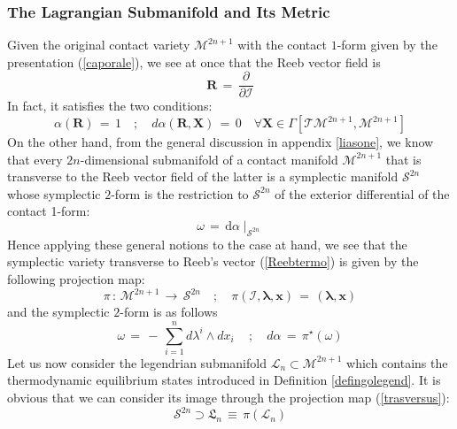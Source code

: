 \documentclass[10pt,a4paper]{article}
\begin{document}
\subsubsection{The Lagrangian Submanifold and Its Metric}
\label{logranofino}
Given the original contact variety $\mathcal{M}^{2n+1}$
with the contact $1$-form given by the presentation
(\ref{caporale}), we see at once that the Reeb vector field is
\begin{equation}\label{Reebtermo}
    \mathbf{R}\, = \, \frac{\partial}{\partial \mathcal{I}}
\end{equation}
In fact, it satisfies the two conditions:
\begin{equation}\label{cominternus}
    \alpha\left(\mathbf{R}\right) \, = \, 1 \quad ; \quad
    d\alpha\left(\mathbf{R}, \mathbf{X}\right)\, = \, 0 \quad
    \forall \mathbf{X} \in \Gamma[\mathcal{TM}^{2n+1},\mathcal{M}^{2n+1}]
\end{equation}
On the other hand, from the general discussion in appendix
\ref{liasone}, we know that every $2n$-dimensional submanifold
of a contact manifold $\mathcal{M}^{2n+1}$  that is
transverse to the Reeb vector field of the latter is a symplectic
manifold $\mathcal{S}^{2n}$ whose symplectic  $2$-form is the restriction
to $\mathcal{S}^{2n}$ of the exterior differential of the contact 1-form:
\begin{equation}\label{rovereto}
    \omega \, = \,
   \mathrm{d}\alpha \mid_{\mathcal{S}^{2n}}
\end{equation}
Hence applying these general notions to the case at hand, we see that the  symplectic variety transverse to Reeb's vector
(\ref{Reebtermo}) is given by the following projection map:
\begin{equation}\label{trasversus}
    \pi \, : \, \mathcal{M}^{2n+1} \, \rightarrow \,
    \mathcal{S}^{2n} \quad ; \quad
    \pi(\mathcal{I},\pmb{\lambda},\mathbf{x})\, = \, (\pmb{\lambda},\mathbf{x})
\end{equation}
and the  symplectic $2$-form  is as follows
\begin{equation}\label{adige}
    \omega \, = \, - \, \sum_{i=1}^{n} d\lambda^i \wedge dx_i \, \quad
    ;\quad d\alpha \, = \, \pi^\star(\omega)
\end{equation}
Let us now consider the legendrian submanifold $\mathcal{L}_n
\subset \mathcal{M}^{2n+1}$ which contains the thermodynamic equilibrium states introduced in Definition \ref{defingolegend}.
It is obvious that we can consider its image through the projection map (\ref{trasversus}):
\begin{equation}\label{corneliatutta}
    \mathcal{S}^{2n} \supset \mathfrak{L}_n \, \equiv \, \pi\left(\mathcal{L}_n\right)
\end{equation}
\end{document}
